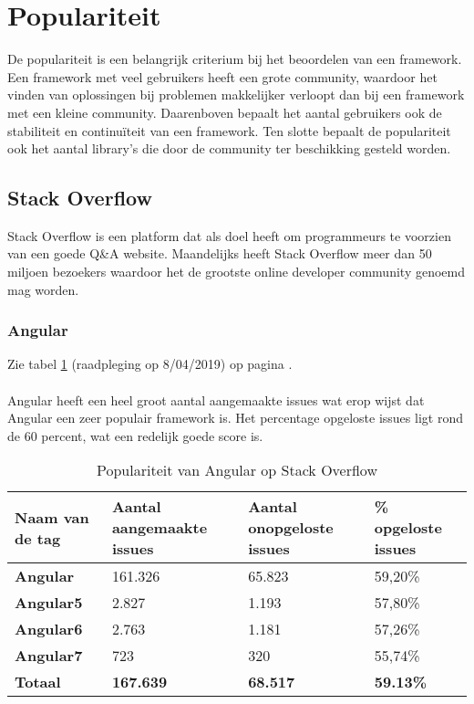 \section{Populariteit}
De populariteit is een belangrijk criterium bij het beoordelen van een framework. Een framework met veel gebruikers heeft een grote community, waardoor het vinden van oplossingen bij problemen makkelijker verloopt dan bij een framework met een kleine community. Daarenboven bepaalt het aantal gebruikers ook de stabiliteit en continuïteit van een framework. Ten slotte bepaalt de populariteit ook het aantal library's die door de community ter beschikking gesteld worden.
\subsection{Stack Overflow}
Stack Overflow is een platform dat als doel heeft om programmeurs te voorzien van een goede Q\&A website. Maandelijks heeft Stack Overflow meer dan 50 miljoen bezoekers waardoor het de grootste online developer community genoemd mag worden. 
\subsubsection{Angular}
Zie tabel \ref{table:angularstackoverflow} (raadpleging op 8/04/2019) op pagina \pageref{table:angularstackoverflow}. \\ \\
Angular heeft een heel groot aantal aangemaakte issues wat erop wijst dat Angular een zeer populair framework is. Het percentage opgeloste issues ligt rond de 60 percent, wat een redelijk goede score is.
\begin{table}[H]
	\begin{tabular}{|l|l|l|l|}
		\hline
		Naam van de tag   & \textbf{Aantal aangemaakte issues} & \textbf{Aantal onopgeloste issues} & \textbf{\% opgeloste issues} \\ \hline
		\textbf{Angular}  & 161.326                            & 65.823                             & 59,20\%                              \\ \hline
		\textbf{Angular5} & 2.827                              & 1.193                              & 57,80\%                              \\ \hline
		\textbf{Angular6} & 2.763                              & 1.181                              & 57,26\%                              \\ \hline
		\textbf{Angular7} & 723                                & 320                                & 55,74\%                              \\ \hline
		\textbf{Totaal}   & \textbf{167.639}                   & \textbf{68.517}                    & \textbf{59.13\%}                     \\ \hline
	\end{tabular}
\caption{Populariteit van Angular op Stack Overflow}
\label{table:angularstackoverflow}
\end{table}
